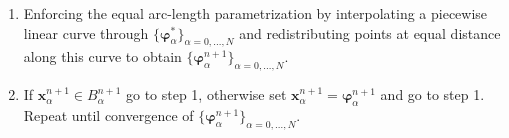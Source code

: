\begin{enumerate}
	\item Enforcing the equal arc-length parametrization by interpolating a piecewise linear curve through $\{\boldsymbol{\varphi}_{\alpha}^\ast\}_{\alpha=0,\dots,N}$
	and redistributing points at equal distance along this curve to obtain $\{\boldsymbol{\varphi}_{\alpha}^{n+1}\}_{\alpha=0,\dots,N}$.
	
	\item If $\mathbf{x}_\alpha^{n+1}\in B_\alpha^{n+1}$ go to step 1, otherwise set $\mathbf{x}_\alpha^{n+1}=\boldsymbol{\varphi}_{\alpha}^{n+1}$ and go to step 1. Repeat until convergence of $\{\boldsymbol{\varphi}_{\alpha}^{n+1}\}_{\alpha=0,\dots,N}$.
\end{enumerate}